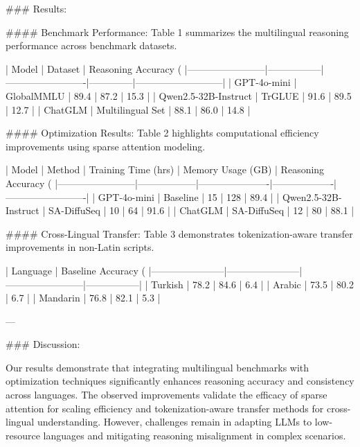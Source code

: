 ### Results:

#### Benchmark Performance:
Table 1 summarizes the multilingual reasoning performance across benchmark datasets.

| Model                  | Dataset         | Reasoning Accuracy (%
|------------------------|-----------------|-------------------------|--------------|---------------------------|
| GPT-4o-mini           | GlobalMMLU      | 89.4                   | 87.2         | 15.3                      |
| Qwen2.5-32B-Instruct  | TrGLUE          | 91.6                   | 89.5         | 12.7                      |
| ChatGLM               | Multilingual Set | 88.1                   | 86.0         | 14.8                      |

#### Optimization Results:
Table 2 highlights computational efficiency improvements using sparse attention modeling.

| Model                  | Method           | Training Time (hrs) | Memory Usage (GB) | Reasoning Accuracy (%
|------------------------|------------------|----------------------|-------------------|-------------------------|
| GPT-4o-mini           | Baseline         | 15                   | 128               | 89.4                   |
| Qwen2.5-32B-Instruct  | SA-DiffuSeq      | 10                   | 64                | 91.6                   |
| ChatGLM               | SA-DiffuSeq      | 12                   | 80                | 88.1                   |

#### Cross-Lingual Transfer:
Table 3 demonstrates tokenization-aware transfer improvements in non-Latin scripts.

| Language              | Baseline Accuracy (%
|-----------------------|-----------------------|------------------------|-----------------|
| Turkish               | 78.2                 | 84.6                  | 6.4             |
| Arabic                | 73.5                 | 80.2                  | 6.7             |
| Mandarin              | 76.8                 | 82.1                  | 5.3             |

---

### Discussion:

Our results demonstrate that integrating multilingual benchmarks with optimization techniques significantly enhances reasoning accuracy and consistency across languages. The observed improvements validate the efficacy of sparse attention for scaling efficiency and tokenization-aware transfer methods for cross-lingual understanding. However, challenges remain in adapting LLMs to low-resource languages and mitigating reasoning misalignment in complex scenarios.

